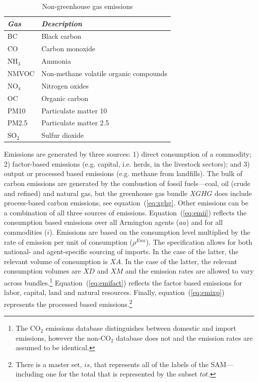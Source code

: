 \documentclass[11pt,letterpaper]{report}
\begin{document}
\begin{table}[H]
\caption{Non-greenhouse gas emissions}
\label{tab:nghg}
\begin{center}
\small
{}
\begin{tabular}{p{2.0cm} p{10.0cm}}
\toprule
{\normalsize \textbf{\emph{Gas}}} & {\normalsize \textbf{\emph{Description}}} \\
\midrule
   BC     & Black carbon \\
   CO     & Carbon monoxide \\
   $\textrm{NH}_3$    & Ammonia \\
   NMVOC   & Non-methane volatile organic compounds \\
   $\textrm{NO}_{\textrm{x}}$    & Nitrogen oxides \\
   OC     & Organic carbon \\
   PM10   & Particulate matter 10 \\
   PM2.5  & Particulate matter 2.5 \\
   $\textrm{SO}_2$    & Sulfur dioxide \\
\bottomrule
\end{tabular}
\end{center}
\end{table}

Emissions are generated
by three sources: 1) direct consumption of a commodity; 2) factor-based
emissions (e.g. capital, i.e. herds, in the livestock sectors); and 3) output or
processed based emissions (e.g. methane from landfills). The bulk of carbon emissions are generated by the combustion of fossil
fuels---coal, oil (crude and refined) and natural gas, but
the greenhouse gas bundle $\mathit{XGHG}$ does
include process-based carbon emissions, see equation~(\ref{eq:xghg}. Other emissions
can be a combination of all three sources of emissions. Equation~(\ref{eq:emii})
reflects the consumption based emissions over all Armington agents
($\mathit{aa}$) and for all commodities ($i$). Emissions are based on the
consumption level multiplied by the rate of emission per unit of consumption
($\rho^{\mathit{Emi}}$). The specification allows for both national- and
agent-specific sourcing of imports. In the case of the latter, the relevant
volume of consumption is $\mathit{XA}$. In the case of the latter, the relevant
consumption volumes are $\mathit{XD}$ and $\mathit{XM}$ and the emission rates
are allowed to vary across bundles.\footnote{The $\textrm{CO}_2$ emissions
database distinguishes between domestic and import emissions, however the
non-$\textrm{CO}_2$ database does not and the emission rates are assumed to be
identical.} Equation~(\ref{eq:emifact}) reflects the factor based emissions for
labor, capital, land and natural resources. Finally, equation~(\ref{eq:emixp})
represents the processed based emissions.\footnote{There is a master set,
$\mathit{is}$, that represents all of the labels of the SAM---including one for
the total that is represented by the subset $\mathit{tot}$.}
\end{document}
